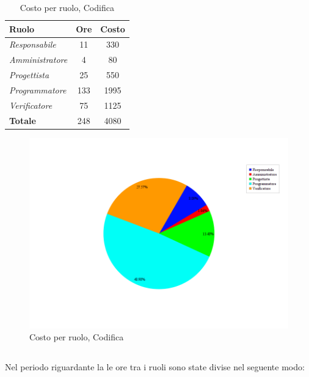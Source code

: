 \begin{table}[H]
	\begin{center}
		\begin{tabular}{|l|c|c|}
			\hline
			\textbf{Ruolo}	& \textbf{Ore} &	\textbf{Costo}	 \\
			\hline
			\textit{Responsabile}	&	11	&	330		\\
			\hline
			\textit{Amministratore}	&	4	&	80		\\
			\hline
			\textit{Progettista}		&	25	&	550		\\
			\hline
			\textit{Programmatore}	&	133	&	1995	\\
			\hline
			\textit{Verificatore}	&	75	&	1125	\\
			\hline
			\textbf{Totale}	&	248	&	4080	\\
			\hline
		\end{tabular}
	\end{center}
	\caption{Costo per ruolo, Codifica}
\end{table}

\begin{figure}[H]
	\centering
	\includegraphics[scale=0.5]{immagini/Grafi/CostoCod}
	\caption{Costo per ruolo, Codifica}
\end{figure}

\newpage
\subsection{\VV}
Nel periodo riguardante la \VV{} le ore tra i ruoli sono state divise nel seguente modo:

